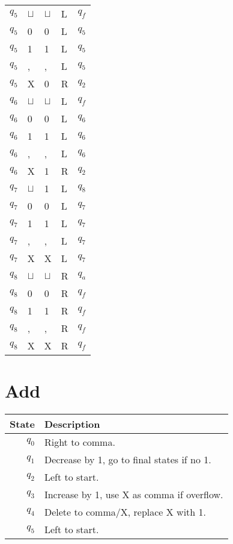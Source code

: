 \documentclass[a4paper, hidelinks, twocolumn, 9pt]{article}
\newcommand{\blm}{\sqcup}
\newcommand{\bl}{\(\blm\)}
\begin{document}
\begin{center}
\begin{tabular}{x{1cm}x{1cm}x{1cm}x{1cm}x{1cm}}
      \(q_5\) & \bl & \bl & L & \(q_f\) \\
      \(q_5\) &   0 &   0 & L & \(q_5\) \\
      \(q_5\) &   1 &   1 & L & \(q_5\) \\
      \(q_5\) &   , &   , & L & \(q_5\) \\
      \(q_5\) &   X &   0 & R & \(q_2\) \\
      \midrule
      \(q_6\) & \bl & \bl & L & \(q_f\) \\
      \(q_6\) &   0 &   0 & L & \(q_6\) \\
      \(q_6\) &   1 &   1 & L & \(q_6\) \\
      \(q_6\) &   , &   , & L & \(q_6\) \\
      \(q_6\) &   X &   1 & R & \(q_2\) \\
      \midrule
      \(q_7\) & \bl &   1 & L & \(q_8\) \\
      \(q_7\) &   0 &   0 & L & \(q_7\) \\
      \(q_7\) &   1 &   1 & L & \(q_7\) \\
      \(q_7\) &   , &   , & L & \(q_7\) \\
      \(q_7\) &   X &   X & L & \(q_7\) \\
      \midrule
      \(q_8\) & \bl & \bl & R & \(q_a\) \\
      \(q_8\) &   0 &   0 & R & \(q_f\) \\
      \(q_8\) &   1 &   1 & R & \(q_f\) \\
      \(q_8\) &   , &   , & R & \(q_f\) \\
      \(q_8\) &   X &   X & R & \(q_f\) \\
      \bottomrule
    \end{tabular}
  \end{center}
    
\section*{Add}
  \begin{tabular}{rl}
    \textbf{State} & \textbf{Description} \\
    \midrule
    \( q_0 \) & Right to comma. \\
    \( q_1 \) & Decrease by 1, go to final states if no 1. \\
    \( q_2 \) & Left to start. \\
    \( q_3 \) & Increase by 1, use X as comma if overflow. \\
    \( q_4 \) & Delete to comma/X, replace X with 1. \\
    \( q_5 \) & Left to start. \\
  \end{tabular}
\end{document}
